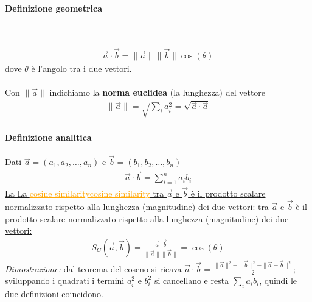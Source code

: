 \documentclass[a4paper,12pt]{article}
\let\mathunderline\underline
\renewcommand{\underline}[1]{\ifmmode\mathunderline{#1}\else\uline{#1}\fi}   %
\newcommand{\hl}[1]{\textcolor{orange}{#1}}
\begin{document}
\paragraph{Definizione geometrica}\mbox{}\\
\begin{minipage}[c]{0.55\textwidth}
\begin{align*}
    \vec{a}\cdot\vec{b} = \|\vec{a}\|\|\vec{b}\|\cos(\theta)
\end{align*}
dove $\theta$ è l'angolo tra i due vettori.\\
\vspace{1px}\\
Con $\|\vec{a}\|$ indichiamo la \textbf{norma euclidea} (la lunghezza) del vettore
\begin{align*}
    \|\vec{a}\| = \sqrt{\sum_i a_i^2} = \sqrt{\vec{a}\cdot\vec{a}}
\end{align*}
\end{minipage}
\hfill
\begin{minipage}[c]{0.42\textwidth}
\centering
{}
\end{minipage}
\paragraph{Definizione analitica} Dati $\vec{a}=(a_1,a_2,\dots,a_n)$ e $\vec{b}=(b_1,b_2,\dots,b_n)$
\begin{align*}
    \vec{a}\cdot\vec{b} = \sum_{i=1}^{n} a_i b_i
\end{align*}
\underline{La }\hl{\underline{cosine similarity}}\underline{ tra $\vec{a}$ e $\vec{b}$ è il prodotto scalare normalizzato rispetto alla lunghezza (magnitudine) dei due vettori:}
\begin{align*}
    S_C(\vec{a},\vec{b}) = \frac{\vec{a}\cdot\vec{b}}{\|\vec{a}\|\|\vec{b}\|} = \cos(\theta)
\end{align*}
\textit{Dimostrazione:} dal teorema del coseno si ricava $\vec{a}\cdot\vec{b}=\frac{\|\vec{a}\|^2+\|\vec{b}\|^2-\|\vec{a}-\vec{b}\|^2}{2}$; sviluppando i quadrati i termini $a_i^2$ e $b_i^2$ si cancellano e resta $\sum_i a_ib_i$, quindi le due definizioni coincidono.
\end{document}

